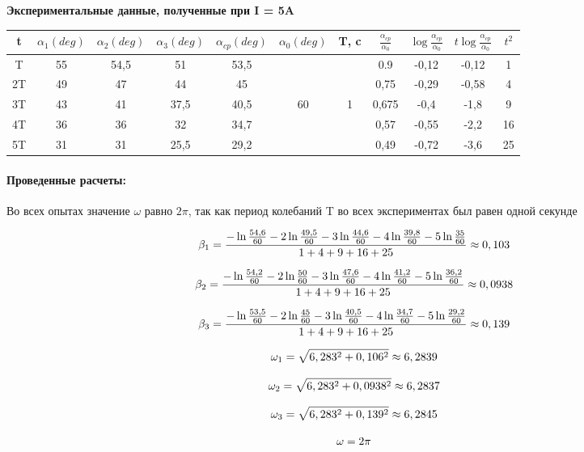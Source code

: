 \documentclass{article}
\begin{document}
	\begin{center}
		\textbf{Экспериментальные данные, полученные при I = 5A}
		\begin{tabular}{|c|c|c|c|c|c|c|c|c|c|c|}
			\hline
			t & $\alpha_1 (deg)$ & $\alpha_2 (deg)$ & $\alpha_3 (deg)$ & $\alpha_{cp} (deg)$ & $\alpha_0 (deg)$ & T, c & $\frac{\alpha_{cp}}{\alpha_0}$ & $\log{\frac{\alpha_{cp}}{\alpha_0}}$ & $t\log{\frac{\alpha_{cp}}{\alpha_0}}$ & $t^{2}$ \\
			\hline
			T & 55 & 54,5 & 51 & 53,5 & & & 0.9 & -0,12 & -0,12 & 1 \\
			\hhline{-----~~----}
			2T & 49 & 47 & 44 & 45 & & & 0,75 & -0,29 & -0,58 & 4 \\
			\hhline{-----~~----}
			3T & 43 & 41 & 37,5 & 40,5 & 60 & 1 & 0,675 & -0,4 & -1,8 & 9 \\
			\hhline{-----~~----}
			4T & 36 & 36 & 32 & 34,7 & & & 0,57 & -0,55 & -2,2 & 16 \\
			\hhline{-----~~----}
			5T & 31 & 31 & 25,5 & 29,2 & & & 0,49 & -0,72 & -3,6 & 25 \\
			\hline
		\end{tabular}
	\end{center}
	
	
	\paragraph{Проведенные расчеты:}
	 Во всех опытах значение $\omega$ равно $2\pi$, так как период колебаний T во всех экспериментах был равен одной секунде
	
	
		$$\large{\beta_1}=\frac{-\ln{\frac{54,6}{60}}-2\ln{\frac{49,5}{60}}-3\ln{\frac{44,6}{60}}-4\ln{\frac{39,8}{60}}-5\ln{\frac{35}{60}}}{1+4+9+16+25}\approx0,103$$
	
	
		$$\large{\beta_2}=\frac{-\ln{\frac{54,2}{60}}-2\ln{\frac{50}{60}}-3\ln{\frac{47,6}{60}}-4\ln{\frac{41,2}{60}}-5\ln{\frac{36,2}{60}}}{1+4+9+16+25}\approx0,0938$$
	
	$$	\large{\beta_3}=\frac{-\ln{\frac{53,5}{60}}-2\ln{\frac{45}{60}}-3\ln{\frac{40,5}{60}}-4\ln{\frac{34,7}{60}}-5\ln{\frac{29,2}{60}}}{1+4+9+16+25}\approx0,139$$

	$$	\large{\omega_1}= \sqrt{6,283^2+0,106^2} \approx6,2839$$

	$$	\large{\omega_2}= \sqrt{6,283^2+0,0938^2} \approx6,2837$$

	$$	\large{\omega_3}= \sqrt{6,283^2+0,139^2} \approx6,2845$$

	$$	\large{\omega}= 2\pi$$
 
\end{document}
